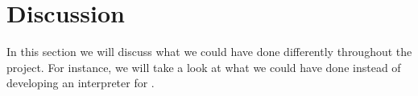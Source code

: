 \section{Discussion}
\label{sec:discussion}

In this section we will discuss what we could have done differently throughout
the project. For instance, we will take a look at what we could have done
instead of developing an interpreter for \productname{}.



